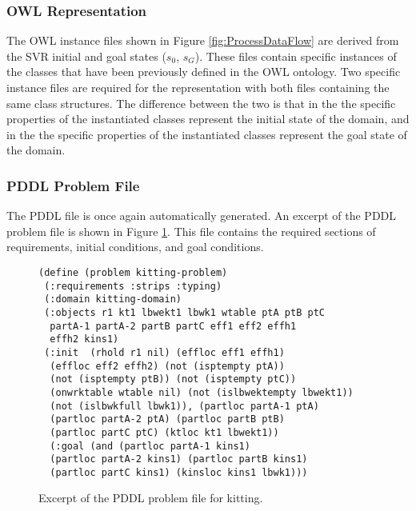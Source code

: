 \subsubsection{OWL Representation}
The OWL instance files shown in Figure \ref{fig:ProcessDataFlow} are derived from the SVR initial and goal states ($s_0$, $s_G$). These files contain
specific instances of the classes that have been previously defined in the OWL ontology. Two specific instance files are required for the representation with
both files containing the same class structures. The difference between the two is that in the  the specific properties of the instantiated 
classes represent the initial state of the domain, and in the  the specific properties of the instantiated classes represent the goal state
of the domain.
\subsubsection{PDDL Problem File}
The PDDL file is once again automatically generated. An excerpt of the PDDL problem file is shown in Figure \ref{fig:problemfile}. This file
contains the required sections of requirements, initial conditions, and goal conditions.

\begin{figure}[h!]
\begin{center}
\begin{minipage}{.5\paperwidth}
\begin{mylisting}
\begin{Verbatim}[commandchars=\\\{\},commandchars=+\[\],fontsize=\scriptsize,numbersep=3pt]
(define (problem kitting-problem)
 (:requirements :strips :typing)
 (:domain kitting-domain)
 (:objects r1 kt1 lbwekt1 lbwk1 wtable ptA ptB ptC
  partA-1 partA-2 partB partC eff1 eff2 effh1
  effh2 kins1)
 (:init  (rhold r1 nil) (effloc eff1 effh1)
  (effloc eff2 effh2) (not (isptempty ptA))
  (not (isptempty ptB)) (not (isptempty ptC))
  (onwrktable wtable nil) (not (islbwektempty lbwekt1))
  (not (islbwkfull lbwk1)), (partloc partA-1 ptA)
  (partloc partA-2 ptA) (partloc partB ptB)
  (partloc partC ptC) (ktloc kt1 lbwekt1))
  (:goal (and (partloc partA-1 kins1)
  (partloc partA-2 kins1) (partloc partB kins1)
  (partloc partC kins1) (kinsloc kins1 lbwk1)))
\end{Verbatim}
\end{mylisting}
\end{minipage}
\caption{Excerpt of the PDDL problem file for kitting.\label{fig:problemfile}}
\end{center}
\end{figure}


